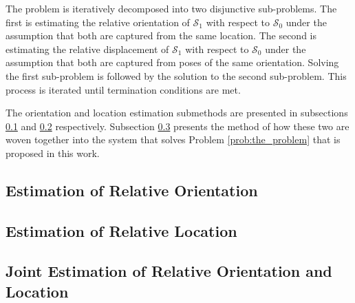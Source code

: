 The problem is iteratively decomposed into two disjunctive sub-problems. The
first is estimating the relative orientation of $\mathcal{S}_1$ with respect to
$\mathcal{S}_0$ under the assumption that both are captured from the same
location. The second is estimating the relative displacement of $\mathcal{S}_1$
with respect to $\mathcal{S}_0$ under the assumption that both are captured
from poses of the same orientation. Solving the first sub-problem is followed
by the solution to the second sub-problem. This process is iterated until
termination conditions are met.

The orientation and location estimation submethods are presented in subsections
\ref{subsec:method_orientation_correction} and
\ref{subsec:method_location_correction} respectively. Subsection
\ref{subsec:method_pose_correction} presents the method of how these two
are woven together into the system that solves Problem \ref{prob:the_problem}
that is proposed in this work.

\subsection{Estimation of Relative Orientation}
  \label{subsec:method_orientation_correction}
  

\subsection{Estimation of Relative Location}
  \label{subsec:method_location_correction}
  

\subsection{Joint Estimation of Relative Orientation and Location}
  \label{subsec:method_pose_correction}
  
